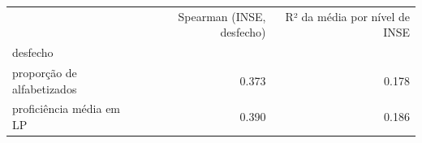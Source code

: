 \begin{tabular}{lrr}
\toprule
 & Spearman (INSE, desfecho) & R² da média por nível de INSE \\
desfecho &  &  \\
\midrule
proporção de alfabetizados & 0.373 & 0.178 \\
proficiência média em LP & 0.390 & 0.186 \\
\bottomrule
\end{tabular}
